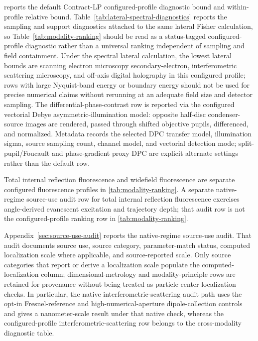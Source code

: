  reports the default Contract-LP configured-profile diagnostic bound and within-profile relative bound. Table~\ref{tab:lateral-spectral-diagnostics} reports the sampling and support diagnostics attached to the same lateral Fisher calculation, so Table~\ref{tab:modality-ranking} should be read as a status-tagged configured-profile diagnostic rather than a universal ranking independent of sampling and field containment. Under the spectral lateral calculation, the lowest lateral bounds are scanning electron microscopy secondary-electron, interferometric scattering microscopy, and off-axis digital holography in this configured profile; rows with large Nyquist-band energy or boundary energy should not be used for precise numerical claims without rerunning at an adequate field size and detector sampling. The differential-phase-contrast row is reported via the configured vectorial Debye asymmetric-illumination model: opposite half-disc condenser-source images are rendered, passed through shifted objective pupils, differenced, and normalized. Metadata records the selected DPC transfer model, illumination sigma, source sampling count, channel model, and vectorial detection mode; split-pupil/Foucault and phase-gradient proxy DPC are explicit alternate settings rather than the default row.


Total internal reflection fluorescence and widefield fluorescence are separate configured fluorescence profiles in \cref{tab:modality-ranking}. A separate native-regime source-use audit row for total internal reflection fluorescence exercises angle-derived evanescent excitation and trajectory depth; that audit row is not the configured-profile ranking row in \cref{tab:modality-ranking}.

Appendix~\ref{sec:source-use-audit} reports the native-regime source-use audit. That audit documents source use, source category, parameter-match status, computed localization scale where applicable, and source-reported scale. Only source categories that report or derive a localization scale populate the computed-localization column; dimensional-metrology and modality-principle rows are retained for provenance without being treated as particle-center localization checks. In particular, the native interferometric-scattering audit path uses the opt-in Fresnel-reference and high-numerical-aperture dipole-collection controls and gives a nanometer-scale result under that native check, whereas the configured-profile interferometric-scattering row belongs to the cross-modality diagnostic table.

